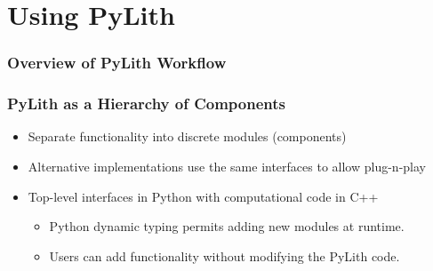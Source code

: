 \documentclass[aspectratio=169]{beamer}
\begin{document}
\section{Using PyLith}

\begin{frame}
  \frametitle{Overview of PyLith Workflow}
  \summary{}

\end{frame}

\begin{frame}
  \frametitle{PyLith as a Hierarchy of Components}

  \begin{minipage}{0.53\textwidth}
    \begin{itemize}
    \item Separate functionality into discrete modules (components)
    \item Alternative implementations use the same interfaces to allow plug-n-play
    \item Top-level interfaces in Python with computational code in C++
      \begin{itemize}
      \item Python dynamic typing permits adding new modules at runtime.
      \item Users can add functionality without modifying the PyLith code.
      \end{itemize}
    \end{itemize}
  \end{minipage}\hfill
  \begin{minipage}{0.43\textwidth}
  \end{minipage}

\end{frame}
\end{document}
